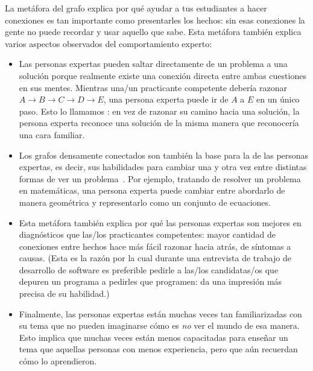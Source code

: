 La metáfora del grafo explica por qué ayudar a tus estudiantes a hacer conexiones es tan importante como presentarles los hechos:
sin esas conexiones
la gente no puede recordar y usar aquello que sabe.
Esta metáfora también explica varios aspectos observados del comportamiento experto:

\begin{itemize}

\item
  Las personas expertas pueden saltar directamente de un problema a una solución
  porque realmente existe una conexión directa entre ambas cuestiones en sus mentes.
  Mientras una/un practicante competente debería razonar
  $A{\rightarrow}B{\rightarrow}C{\rightarrow}D{\rightarrow}E$,
  una persona experta puede ir de $A$ a $E$ en un único paso.
  Esto lo llamamos :
  en vez de razonar su camino hacia una solución,
  la persona experta reconoce una solución de la misma manera que reconocería una cara familiar.

\item
  Los grafos densamente conectados son también la base para la 
   de las personas expertas,
 es decir, sus habilidades para cambiar una y otra vez entre distintas formas de ver un problema~\cite{Petr2016}.
  Por ejemplo,
  tratando de resolver un problema en matemáticas,
  una persona experta puede cambiar entre abordarlo de manera geométrica 
  y representarlo como un conjunto de ecuaciones.

\item
  Esta metáfora también explica por qué las personas expertas son mejores en diagnósticos que las/los practicantes competentes:
 mayor cantidad de conexiones entre hechos hace más fácil razonar hacia atrás, de síntomas a causas.
  (Esta es la razón por la cual durante una entrevista de trabajo de desarrollo de software es 
  preferible pedirle a las/los candidatas/os que depuren un programa a pedirles que programen: 
  da una impresión más precisa de su habilidad.)

\item
  Finalmente,
  las personas expertas están muchas veces tan familiarizadas con su tema que
  no pueden imaginarse cómo es \emph{no} ver el mundo de esa manera.
  Esto implica que muchas veces están menos capacitadas para enseñar un tema que aquellas personas con menos experiencia, 
  pero que aún recuerdan cómo lo aprendieron.

\end{itemize}

